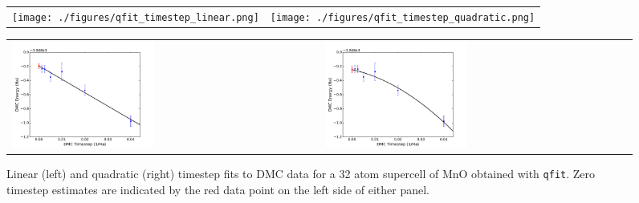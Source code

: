 \begin{figure}
  \centering
\ifdefined\HCode%
  \begin{xltabular}[l]{1024pt}{X X}
    \texttt{[image: ./figures/qfit\_timestep\_linear.png]}&
    \texttt{[image: ./figures/qfit\_timestep\_quadratic.png]}\\
  \end{xltabular}
\else%
  \begin{xltabular}[l]{\textwidth}{X X}
    \includegraphics[trim=0mm 0mm 4mm 0mm,clip,width=0.47\textwidth]{./figures/qfit_timestep_linear.pdf}&
    \includegraphics[trim=2mm 0mm 4mm 0mm,clip,width=0.47\textwidth]{./figures/qfit_timestep_quadratic.pdf}\\
    \end{xltabular}
\fi%
\caption{Linear (left) and quadratic (right) timestep fits to DMC data for a 32 atom supercell of MnO obtained with \texttt{qfit}.  Zero timestep estimates are indicated by the red data point on the left side of either panel.}
  \label{fig:qfit_timestep}
\end{figure}

